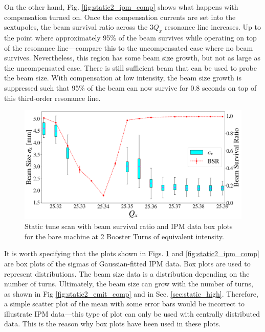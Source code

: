 On the other hand, Fig. \ref{fig:static2_ipm_comp} shows what happens with compensation turned on. Once the compensation currents are set into the sextupoles, the beam survival ratio across the $3Q_x$ resonance line increases. Up to the point where approximately 95\% of the beam survives while operating on top of the resonance line---compare this to the uncompensated case where no beam survives. Nevertheless, this region has some beam size growth, but not as large as the uncompensated case. There is still sufficient beam that can be used to probe the beam size. With compensation at low intensity, the beam size growth is suppressed such that 95\% of the beam can now survive for 0.8 seconds on top of this third-order resonance line.   

\begin{figure}[H]
    \centering
    \includegraphics[width=\columnwidth]{chapter4/static2turns_ipm.png}
    \caption{Static tune scan with beam survival ratio and IPM data box plots for the bare machine at 2 Booster Turns of equivalent intensity.}
    \label{fig:static2_ipm}
\end{figure}

It is worth specifying that the plots shown in Figs. \ref{fig:static2_ipm} and \ref{fig:static2_ipm_comp} are box plots of the sigmas of Gaussian-fitted IPM data. Box plots are used to represent distributions. The beam size data is a distribution depending on the number of turns. Ultimately, the beam size can grow with the number of turns, as shown in Fig \ref{fig:static2_emit_comp} and in Sec. \ref{sec:static_high}. Therefore, a simple scatter plot of the mean with some error bars would be incorrect to illustrate IPM data---this type of plot can only be used with centrally distributed data. This is the reason why box plots have been used in these plots.

